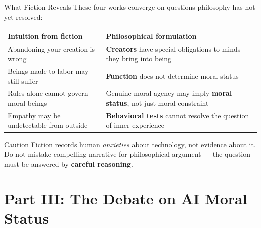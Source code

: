 \documentclass[aspectratio=169,11pt]{beamer}
\begin{document}
\begin{frame}[shrink=3]{What Fiction Reveals}
These four works converge on questions philosophy has not yet resolved:

\vspace{0.15cm}
\begin{tabular}{@{}p{4.2cm}p{7.5cm}@{}}
\toprule
\textbf{Intuition from fiction} & \textbf{Philosophical formulation} \\
\midrule
Abandoning your creation is wrong & \textbf{Creators} have special obligations to minds they bring into being \\
\addlinespace
Beings made to labor may still suffer & \textbf{Function} does not determine moral status \\
\addlinespace
Rules alone cannot govern moral beings & Genuine moral agency may imply \textbf{moral status}, not just moral constraint \\
\addlinespace
Empathy may be undetectable from outside & \textbf{Behavioral tests} cannot resolve the question of inner experience \\
\bottomrule
\end{tabular}

\vspace{0.15cm}
\begin{alertblock}{Caution}
\scriptsize
Fiction records human \emph{anxieties} about technology, not evidence about it. Do not mistake compelling narrative for philosophical argument --- the question must be answered by \textbf{careful reasoning}.
\end{alertblock}
\end{frame}

\section{Part III: The Debate on AI Moral Status}
\end{document}
